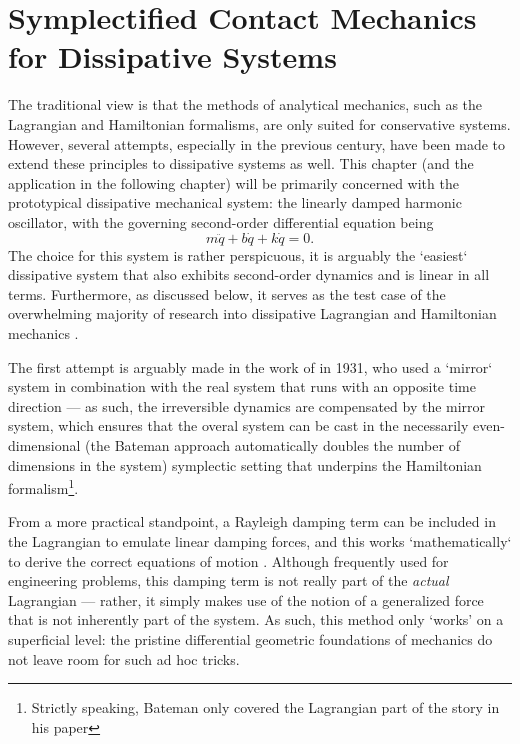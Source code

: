 \chapter{Symplectified Contact Mechanics for Dissipative Systems}

The traditional view is that the methods of analytical mechanics, such as the Lagrangian and Hamiltonian formalisms, are only suited for conservative systems. However, several attempts, especially in the previous century, have been made to extend these principles to dissipative systems as well. This chapter (and the application in the following chapter) will be primarily concerned with the prototypical dissipative mechanical system: the linearly damped harmonic oscillator, with the governing second-order differential equation being
\begin{equation}  
  m\ddot{q} + b\dot{q} + k\dot{q} = 0.
\end{equation}
The choice for this system is rather perspicuous, it is arguably the `easiest` dissipative system that also exhibits second-order dynamics and is linear in all terms. Furthermore, as discussed below, it serves as the test case of the overwhelming majority of research into dissipative Lagrangian and Hamiltonian mechanics \cite{Dekker1981,Hutters2020b}.

The first attempt is arguably made in the work of \citet{Bateman1931} in 1931, who used a `mirror` system in combination with the real system that runs with an opposite time direction --- as such, the irreversible dynamics are compensated by the mirror system, which ensures that the overal system can be cast in the necessarily even-dimensional (the Bateman approach automatically doubles the number of dimensions in the system) symplectic setting that underpins the Hamiltonian formalism\footnote{Strictly speaking, Bateman only covered the Lagrangian part of the story in his paper}. 

From a more practical standpoint, a Rayleigh damping term can be included in the Lagrangian to emulate linear damping forces, and this works `mathematically` to derive the correct equations of motion \cite{Goldstein2011}. Although frequently used for engineering problems, this damping term is not really part of the \emph{actual} Lagrangian --- rather, it simply makes use of the notion of a generalized force that is not inherently part of the system. As such, this method only `works' on a superficial level: the pristine differential geometric foundations of mechanics do not leave room for such ad hoc tricks.

